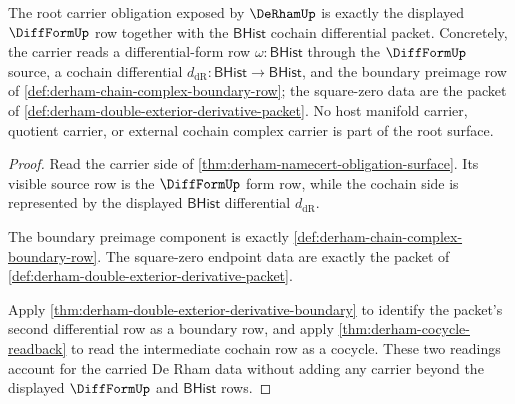 \begin{theorem}
\label{thm:derham-root-carrier-obligation}
The root carrier obligation exposed by $\DeRhamUp$ is exactly the displayed
$\DiffFormUp$ row together with the $\mathsf{BHist}$ cochain differential
packet. Concretely, the carrier reads a differential-form row
$\omega:\mathsf{BHist}$ through the $\DiffFormUp$ source, a cochain
differential $d_{\mathrm{dR}}:\mathsf{BHist}\to\mathsf{BHist}$, and the
boundary preimage row of \autoref{def:derham-chain-complex-boundary-row};
the square-zero data are the packet of
\autoref{def:derham-double-exterior-derivative-packet}. No host manifold
carrier, quotient carrier, or external cochain complex carrier is part of the
root surface.
\end{theorem}
\begin{proof}
Read the carrier side of
\autoref{thm:derham-namecert-obligation-surface}. Its visible source row is
the $\DiffFormUp$ form row, while the cochain side is represented by the
displayed $\mathsf{BHist}$ differential $d_{\mathrm{dR}}$.

The boundary preimage component is exactly
\autoref{def:derham-chain-complex-boundary-row}. The square-zero endpoint
data are exactly the packet of
\autoref{def:derham-double-exterior-derivative-packet}.

Apply \autoref{thm:derham-double-exterior-derivative-boundary} to identify
the packet's second differential row as a boundary row, and apply
\autoref{thm:derham-cocycle-readback} to read the intermediate cochain row
as a cocycle. These two readings account for the carried De Rham data without
adding any carrier beyond the displayed $\DiffFormUp$ and $\mathsf{BHist}$
rows.
\end{proof}

